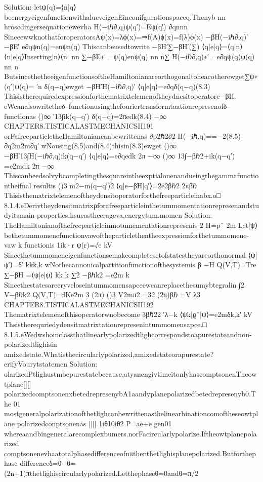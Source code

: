 {{{{{{{{{{Solution:
letψ(q)=⟨n|q⟩beenergyeigenfunctionwithalueveigenEinconifgurationspaceq.Thenyb
nn
hroscdingersequationewevha
H(−iℏ∂,q)ψ(q′)=Eψ(q′)
∂qnnn
SinceewwknothatforoperatorsAψ(x)=λϕ(x)=⇒f(A)ϕ(x)=f(λ)ϕ(x)
−βH(−iℏ∂,q)′−βE′
e∂qψn(q)=enψn(q)
Thiscanbeusedtowrite
−βH′∑−βH′(∑)
⟨q|e|q⟩=⟨q|n⟩⟨n|e|q⟩Inserting|n⟩⟨n|
nn
∑−βE∗′
=ψ(q)enψ(q)
nn
n∑
H(−iℏ∂,q)∗′
=e∂qψ(q)ψ(q)
nn
n
ButsincethetheeigenfunctionsoftheHamiltonianareorthogonaltoheacotherewget∑ψ∗(q′)ψ(q)=
′n
δ(q−q)ewget
−βH′H(−iℏ∂,q)′
⟨q|e|q⟩=e∂qδ(q−q)(8.3)
Thisistherequiredexpressionforthematrixtelemenoftheydnesitoperatore−βH.
eWcanalsowritetheδ–functionusingthefouriertransformtaationrepresenofδ–functionas
()∞
′13∫ik(q−q′)
δ(q−q)=2πedk(8.4)
−∞
CHAPTER8.TISTICALASTMECHANICSII191
orFafreeparticletheHamiltoniancanbewrittenas
∂p2ℏ2∂2
H(−iℏ,q)==−2(8.5)
∂q2m2m∂q′
wNousing(8.5)and(8.4)thisin(8.3)ewget
()∞
−βH′13∫H(−iℏ∂,q)ik(q−q′)
⟨q|e|q⟩=e∂qedk
2π
−∞
()∞
13∫−βℏ2+ik(q−q′)
=e2mdk
2π
−∞
Thiscanbeedsolvybcompletingthesquareintheexptialonenandusingthegammafunctiontheifnal
resultis
()3
m2−m(q−q′)2
⟨q|e−βH|q′⟩=2e2βℏ2
2πβℏ
Thisisthematrixtelemenoftheydensitoperatorforthefreeparticleinabx.o□
8.1.4.eDerivtheydensitmatrixρforafreeparticleinthetummomentationrepresenandstudyitsmain
properties,hsucastheerageva,energytum.momen
Solution:
TheHamiltonianofthefreeparticleinmotumementationrepresenis
2
H=pˆ
2m
Let|ψ⟩bethetummomenefunctionvawoftheparticlethentheexpressionforthetummomene-vaw
k
functionis
1ik·r
ψ(r)=√e
kV
Sincethetummomeneigenfunctionsemakcompletesetofstatestheyareorthonormal
⟨ψ|ψ′⟩=δ′
kkk,k
wNothecannonicalpartitionfunctionofthesystemis
β
−H
Q(V,T)=Tre
∑−βH
=⟨ψ|e|ψ⟩
kk
k
∑2
−βℏk2
=e2m
k
Sincethestatesareeryvcloseintummomensapceewcanreplacethesumybtegralin
∫2
V−βℏk2
Q(V,T)=dKe2m
3
(2π)
()3
V2mπ2
=32
(2π)βℏ
=V
λ3
CHAPTER8.TISTICALASTMECHANICSII192
Thematrixtelemenofthisoperatorwnobecome
3βℏ22
′λ−k
⟨ψk|ϱˆ|ψ⟩=e2mδk,k′
kV
Thsistherequriedydensitmatrixtationrepresenintummomensapce.□
8.1.5.eWedwshoinclassthatlinearlypolarizedtlighcorrespondstoapurestateandnon-polarizedtlighisin
amixedstate.Whatisthecircularlypolarized,amixedstateorapurestate?erifyVourytstatemen
Solution:
olarizedPtlighustmbepurestatebecause,atyanengivtimeitonlyhascomptsonenTheowtplane[][]
polarizedcomptsonenxbetedrepresenybA1aandyplanepolarizedbetedrepresenyb0.The
01
mostgeneralpolarizationofthetlighcanbewrittenasthelinearbinationcomoftheseowtplane
polarizedconptsonenas
[][]
1iθ10iθ2
P=ae+e
gen01
whereaandbingeneralarecomplexbumers.norFacircularlypolarize.Iftheowtplanepolarized
comptsonenevhaatotalphasedifferenceofnπthenthetlighisplanepolarized.Butforthephase
differenceδ=θ−θ=(2n+1)πthetlighiscircularlypolarized.Letthephaseθ=0andθ=π/2
}}}}}}}}}}
